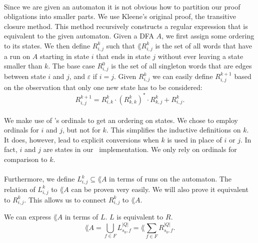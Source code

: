 \paragraph{}
Since we are given an automaton it is not obvious how to partition our proof obligations into smaller parts.
We use Kleene's original proof, the transitive closure method. 
This method recursively constructs a regular expression that is equivalent to the given automaton.
Given a DFA $A$, we first assign some ordering to its states. We then define $R^k_{i,j}$ such that 
$\lang{R^k_{i,j}}$ is the set of all words that have a run on $A$ starting in state $i$ that ends in state $j$ without ever leaving a state smaller than $k$. 
The base case $R^{0}_{i,j}$ is the set of all singleton words that are edges between state $i$ and $j$, and $\varepsilon$ if $i=j$. 
Given $R^k_{i,j}$ we can easily define $R^{k+1}_{i,j}$ based on the observation that only one new state has to be considered:
\[                    R^{k+1}_{i,j} = R^{k}_{i,k} \cdot (R^{k}_{k,k})^* \cdot R^{k}_{k,j} + R^{k}_{i,j}.                    \]
\paragraph{}
We make use of \ssreflect's ordinals to get an ordering on states. 
We chose to employ ordinals for $i$ and $j$, but not for $k$. 
This simplifies the inductive definitions on $k$. 
It does, however, lead to explicit conversions when $k$ is used in place of $i$ or $j$.
In fact, $i$ and $j$ are states in our \coq\ implementation. 
We only rely on ordinals for comparison to $k$.
\paragraph{}
Furthermore, we define $L^k_{i,j} \subseteq \lang{A}$ in terms of runs on the automaton. 
The relation of $L^k_{i,j}$ to $\lang{A}$ can be proven very easily.
We will also prove it equivalent to $R^k_{i,j}$.
This allows us to connect $R^k_{i,j}$ to $\lang{A}$.
\vspace{-0.3cm} 

\begin{theorem} We can express $\lang{A}$ in terms of $L$. $L$ is equivalent to $R$.
    \label{LR}
    \[                          \lang{A} = \bigcup\limits_{f \in F} L^{|Q|}_{s_0, f} = \lang{\sum\limits_{f \in F} R^{|Q|}_{s_0, f}}.                            \]
\end{theorem}

